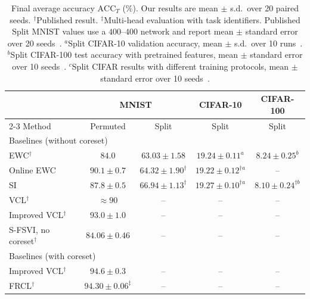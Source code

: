 \documentclass{article}
\begin{document}
\begin{table}[t]
  \centering
  \caption{Final average accuracy $\mathrm{ACC}_T$ (\%). Our results are mean $\pm$
  s.d.\ over 20 paired seeds. $^\dagger$Published result.
  $^\ddagger$Multi-head evaluation with task identifiers. Published Split
  MNIST values use a $400$--$400$ network and report mean $\pm$ standard
  error over 20 seeds~\cite{vandeven2019three,vandeven2022types}.
  $^a$Split CIFAR-10 validation accuracy, mean $\pm$ s.d.\ over 10
  runs~\cite{mazur2021target}. $^b$Split CIFAR-100 test accuracy with
  pretrained features, mean $\pm$ standard error over 10
  seeds~\cite{vandeven2022types}. $^c$Split CIFAR results with different
  training protocols, mean $\pm$ standard error over 10
  seeds~\cite{kessler2023sequential}.}
  \label{tab:main_results}
  \footnotesize
  \setlength{\tabcolsep}{4pt}
  \begin{tabular*}{\textwidth}{@{\extracolsep{\fill}}lcccc@{}}
  \hline
  & \multicolumn{2}{c}{MNIST} & CIFAR-10 & CIFAR-100 \\
  \cline{2-3}
  Method & Permuted & Split & Split & Split \\
  \hline
  \multicolumn{5}{l}{Baselines (without coreset)} \\
  EWC$^\dagger$~\cite{kirkpatrick2017ewc,nguyen2018vcl,vandeven2022types,mazur2021target}
      & $84.0$ & $63.03\pm1.58$ & $19.24\pm0.11^{a}$ & $8.24\pm0.25^{b}$ \\
  Online EWC~\cite{schwarz2018progress,vandeven2019three,mazur2021target}
      & $90.1\pm0.7$ & $64.32\pm1.90^{\dagger}$ & $19.22\pm0.12^{\dagger a}$ & -- \\
  SI~\cite{zenke2017si,vandeven2022types,mazur2021target}
      & $87.8\pm0.5$ & $66.94\pm1.13^{\dagger}$
      & $19.27\pm0.10^{\dagger a}$ & $8.10\pm0.24^{\dagger b}$ \\
  VCL$^\dagger$~\cite{nguyen2018vcl}
      & $\approx90$ & -- & -- & -- \\
  Improved VCL$^\dagger$~\cite{swaroop2019improving}
      & $93.0\pm1.0$ & -- & -- & -- \\
  S-FSVI, no coreset$^\dagger$~\cite{rudner2022sfsvi}
      & $84.06\pm0.46$ & -- & -- & -- \\
  \hline
  \multicolumn{5}{l}{Baselines (with coreset)} \\
  Improved VCL$^\dagger$~\cite{swaroop2019improving}
      & $94.6\pm0.3$ & -- & -- & -- \\
  FRCL$^\dagger$~\cite{titsias2020frcl,rudner2022sfsvi}
      & $94.30\pm0.06^{\ddagger}$ & -- & -- & -- \\

\end{tabular*}
\end{table}
\end{document}
